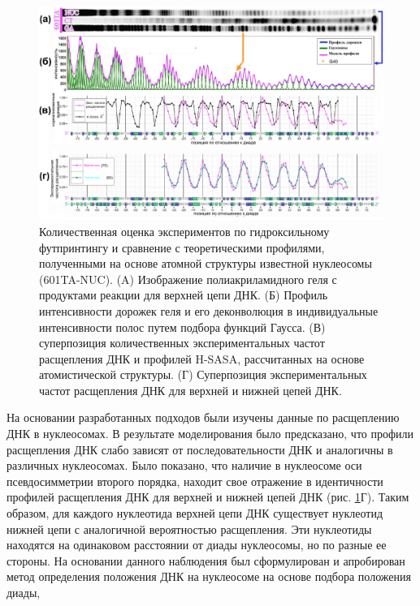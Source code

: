 \begin{figure}[H]
    \centering
    \includegraphics[width=\textwidth]{images/p5/part5_2_nar/p5_2_f5.pdf}
    \caption[Количественная оценка экспериментов по гидроксильному футпринтингу и сравнение с теоретическими профилями, полученными на основе атомной структуры известной нуклеосомы (601TA-NUC)]{Количественная оценка экспериментов по гидроксильному футпринтингу и сравнение с теоретическими профилями, полученными на основе атомной структуры известной нуклеосомы (601TA-NUC). (A) Изображение полиакриламидного геля с продуктами реакции для верхней цепи ДНК. (Б) Профиль интенсивности дорожек геля и его деконволюция в индивидуальные интенсивности полос путем подбора функций Гаусса. (В) суперпозиция количественных экспериментальных частот расщепления ДНК и профилей H-SASA, рассчитанных на основе атомистической структуры. (Г) Суперпозиция экспериментальных частот расщепления ДНК для верхней и нижней цепей ДНК.}
    \label{fig:p5:p5_2_f5}
\end{figure}


На основании разработанных подходов были изучены данные по расщеплению ДНК в нуклеосомах. В результате моделирования было предсказано, что профили расщепления ДНК слабо зависят от последовательности ДНК и аналогичны в различных нуклеосомах. Было показано, что наличие в нуклеосоме оси псевдосимметрии второго порядка, находит свое отражение в идентичности профилей расщепления ДНК для верхней и нижней цепей ДНК (рис. \ref{fig:p5:p5_2_f5}Г). Таким образом, для каждого нуклеотида верхней цепи ДНК существует нуклеотид нижней цепи с аналогичной вероятностью расщепления. Эти нуклеотиды находятся на одинаковом расстоянии от диады нуклеосомы, но по разные ее стороны. На основании данного наблюдения был сформулирован и апробирован метод определения положения ДНК на нуклеосоме на основе подбора положения диады,

